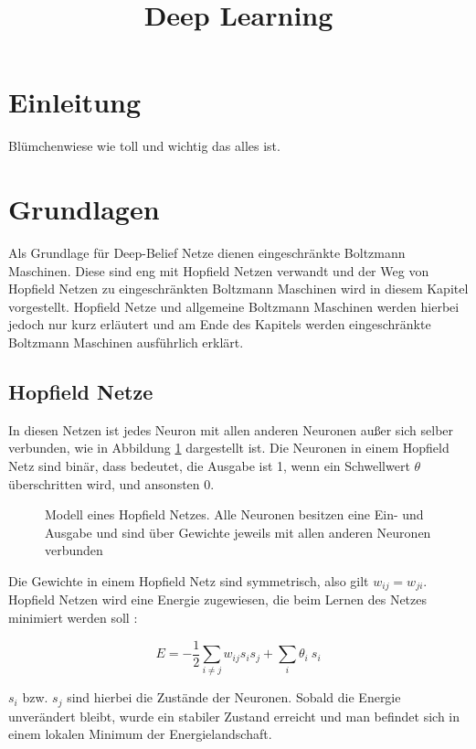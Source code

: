 \documentclass[12pt]{article}
\title{Deep Learning}
\begin{document}
	\maketitle

	\newpage

	\tableofcontents
	
	\newpage
	\section{Einleitung}
	Blümchenwiese wie toll und wichtig das alles ist.
	\newpage
	\section{Grundlagen}
	Als Grundlage für Deep-Belief Netze dienen eingeschränkte Boltzmann Maschinen. Diese sind eng mit Hopfield Netzen verwandt und der Weg von Hopfield Netzen zu eingeschränkten Boltzmann Maschinen wird in diesem Kapitel vorgestellt. Hopfield Netze und allgemeine Boltzmann Maschinen werden hierbei jedoch nur kurz erläutert und am Ende des Kapitels werden eingeschränkte Boltzmann Maschinen ausführlich erklärt.
	
	
	\subsection{Hopfield Netze}	
	In diesen Netzen ist jedes Neuron mit allen anderen Neuronen außer sich selber verbunden, wie in Abbildung \ref{HopfieldNetz} dargestellt ist.  Die Neuronen in einem Hopfield Netz sind binär, dass bedeutet, die Ausgabe ist 1, wenn ein Schwellwert $\theta$ überschritten wird, und ansonsten 0.
	\begin{figure}[H]
	\center
	
	\caption{Modell eines Hopfield Netzes. Alle Neuronen besitzen eine Ein- und Ausgabe und sind über Gewichte jeweils mit allen anderen Neuronen verbunden}
	\label{HopfieldNetz}
	\end{figure}
Die Gewichte in einem Hopfield Netz sind symmetrisch, also gilt $w_{ij} = w_{ji}$. Hopfield Netzen wird eine Energie zugewiesen, die beim Lernen des Netzes minimiert werden soll \cite{Hopfield}:

\begin{equation}
E = -\frac{1}{2}\sum_{i\neq j}{w_{ij}{s_i}{s_j}}+\sum_i{\theta_i\ s_i}
\end{equation}

$s_i$ bzw. $s_j$ sind hierbei die Zustände der Neuronen. Sobald die Energie unverändert bleibt, wurde ein stabiler Zustand erreicht und man befindet sich in einem lokalen Minimum der Energielandschaft.
\end{document}
